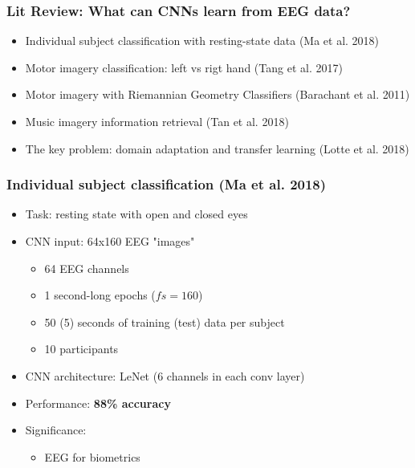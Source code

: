 \documentclass{beamer}
\begin{document}
\begin{frame}
	\frametitle{Lit Review: What can CNNs learn from EEG data?}
	
	\begin{itemize}

		\item Individual subject classification with resting-state data (Ma et al. 2018)

		\item Motor imagery classification: left vs rigt hand (Tang et al. 2017)

		\item Motor imagery with Riemannian Geometry Classifiers (Barachant et al. 2011)

		\item Music imagery information retrieval (Tan et al. 2018)
		
		\item The key problem: domain adaptation and transfer learning (Lotte et al. 2018) 

	\end{itemize}

\end{frame}

\begin{frame}
	\frametitle{Individual subject classification (Ma et al. 2018)}
	
	\begin{itemize}

		\item Task: resting state with open and closed eyes

		\item CNN input: 64x160 EEG "images" 
		\begin{itemize}
			\item 64 EEG channels
			\item 1 second-long epochs ($fs = 160$)
			\item 50 (5) seconds of training (test) data per subject 
			\item 10 participants
		\end{itemize}

		\item CNN architecture: LeNet (6 channels in each conv layer)
	
		\item Performance: \textbf{88\% accuracy}

		\item Significance: 
		\begin{itemize}
			\item EEG for biometrics
		\end{itemize}

	\end{itemize}

\end{frame}
\end{document}
